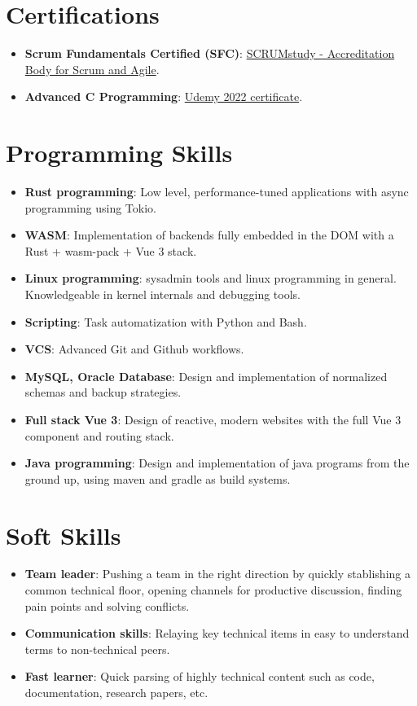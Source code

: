 \documentclass[letterpaper,11pt]{article}
\newcommand{\resumeItem}[2]{
  \item\small{
    \textbf{#1}{: #2 \vspace{-2pt}}
  }
}
\newcommand{\resumeSubItem}[2]{\resumeItem{#1}{#2}\vspace{-4pt}}
\newcommand{\resumeSubHeadingListStart}{\begin{itemize}[leftmargin=*]}
\newcommand{\resumeSubHeadingListEnd}{\end{itemize}}
\begin{document}
\section{Certifications}
 \resumeSubHeadingListStart
  \resumeSubItem{Scrum Fundamentals Certified (SFC)}{
  \href{https://www.scrumstudy.com/certification/verify?type=SFC&number=931455}{SCRUMstudy - Accreditation Body for Scrum and Agile}.}
  \resumeSubItem{Advanced C
  Programming}{\href{https://ude.my/UC-0dadf9b3-11ae-4f4d-8a76-6f1aa45b2b53/}{Udemy
  2022 certificate}.}
 \resumeSubHeadingListEnd

\section{Programming Skills}
 \resumeSubHeadingListStart
  \resumeSubItem{Rust programming}{Low level, performance-tuned
  applications with async programming using Tokio.}
  \resumeSubItem{WASM}{Implementation of backends fully embedded in the
  DOM with a Rust +
  wasm-pack + Vue 3 stack.}
  \resumeSubItem{Linux programming}{sysadmin tools and linux
  programming in general. Knowledgeable in kernel internals and debugging tools.}
  \resumeSubItem{Scripting}{Task automatization with Python and Bash.}
  \resumeSubItem{VCS}{Advanced Git and Github workflows.}
  \resumeSubItem{MySQL, Oracle Database}{Design and implementation
  of normalized schemas and backup strategies.}
  \resumeSubItem{Full stack Vue 3}{Design of reactive, modern websites
  with the full Vue 3 component and routing stack.}
  \resumeSubItem{Java programming}{Design and implementation of java
  programs from the ground up, using maven and gradle as build systems.}
\resumeSubHeadingListEnd

\section{Soft Skills}
 \resumeSubHeadingListStart
  \resumeSubItem{Team leader}{Pushing a team in the right direction by
  quickly stablishing a common technical floor, opening channels for productive discussion, finding pain points and
  solving conflicts.}
  \resumeSubItem{Communication skills}{Relaying key technical items in easy to understand terms to non-technical peers.}
  \resumeSubItem{Fast learner}{Quick parsing of highly technical content such as code, documentation, research papers, etc.}
 \resumeSubHeadingListEnd
\end{document}
